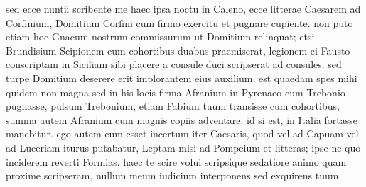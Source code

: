  sed ecce nuntii scribente me haec ipsa noctu in Caleno, ecce litterae Caesarem ad Corfinium, Domitium Corfini cum firmo exercitu et pugnare cupiente. non puto etiam hoc Gnaeum nostrum commissurum ut Domitium relinquat; etsi Brundisium Scipionem cum cohortibus duabus praemiserat, legionem ei Fausto conscriptam in Siciliam sibi placere a consule duci scripserat ad consules. sed turpe Domitium deserere erit implorantem eius auxilium. est quaedam spes mihi quidem non magna sed in his locis firma Afranium in Pyrenaeo cum Trebonio pugnasse, pulsum Trebonium, etiam Fabium tuum transisse cum cohortibus, summa autem Afranium cum magnis copiis adventare. id si est, in Italia fortasse manebitur. ego autem cum esset incertum iter Caesaris, quod vel ad Capuam vel ad Luceriam iturus putabatur, Leptam misi ad Pompeium et litteras; ipse ne quo inciderem reverti Formias. haec te scire volui scripsique sedatiore animo quam proxime scripseram, nullum meum iudicium interponens sed exquirens tuum.
